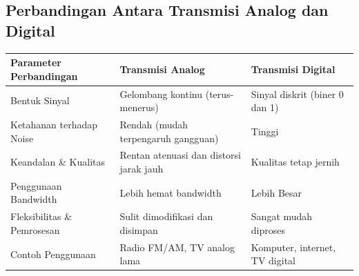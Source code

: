\subsection{Perbandingan Antara Transmisi Analog dan Digital}
\begin{table}[H]
  \centering
  \begin{tabular}{lll}
    \toprule
    \textbf{Parameter Perbandingan} & \textbf{Transmisi Analog} & \textbf{Transmisi Digital} \\
    \midrule
    Bentuk Sinyal & Gelombang kontinu (terus-menerus) & Sinyal diskrit (biner 0 dan 1) \\
    Ketahanan terhadap Noise & Rendah (mudah terpengaruh gangguan) & Tinggi \\
    Keandalan \& Kualitas & Rentan atenuasi dan distorsi jarak jauh & Kualitas tetap jernih \\
    Penggunaan Bandwidth & Lebih hemat bandwidth & Lebih Besar\\
    Fleksibilitas \& Pemrosesan & Sulit dimodifikasi dan disimpan & Sangat mudah diproses  \\
    Contoh Penggunaan & Radio FM/AM, TV analog lama & Komputer, internet, TV digital \\
    \bottomrule
  \end{tabular}
\end{table}
